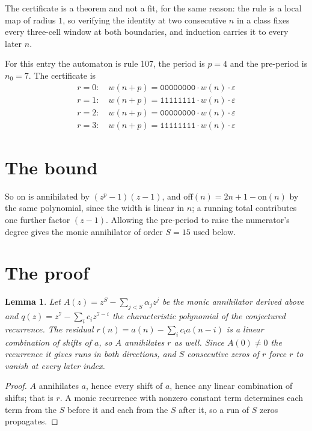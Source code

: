 \documentclass[11pt,a4paper]{article}
\theoremstyle{plain}
\newtheorem{lemma}[theorem]{Lemma}
\theoremstyle{definition}
\begin{document}
The certificate is a theorem and not a fit, for the same reason: the rule is a local map of
radius $1$, so verifying the identity at two consecutive $n$ in a class fixes every three-cell
window at both boundaries, and induction carries it to every later $n$.

For this entry the automaton is rule 107, the period is $p=4$ and the pre-period is $n_0=7$.
The certificate is
\begin{gather*}
r=0:\quad w(n+p) = \texttt{00000000} \cdot w(n) \cdot \varepsilon \\
r=1:\quad w(n+p) = \texttt{11111111} \cdot w(n) \cdot \varepsilon \\
r=2:\quad w(n+p) = \texttt{00000000} \cdot w(n) \cdot \varepsilon \\
r=3:\quad w(n+p) = \texttt{11111111} \cdot w(n) \cdot \varepsilon
\end{gather*}

\section{The bound}

So
$\mathrm{on}$ is annihilated by $(z^p-1)(z-1)$, and $\mathrm{off}(n)=2n+1-\mathrm{on}(n)$ by
the same polynomial, since the width is linear in $n$; a running total contributes one further
factor $(z-1)$. Allowing the pre-period to raise the numerator's degree gives the monic
annihilator of order $S=15$ used below.

\section{The proof}

\begin{lemma}\label{lem:crit}
Let $A(z)=z^S-\sum_{j<S}\alpha_jz^{j}$ be the monic annihilator derived above and
$q(z)=z^{7}-\sum_ic_iz^{7-i}$ the characteristic polynomial of the conjectured
recurrence. The residual $r(n)=a(n)-\sum_ic_ia(n-i)$ is a linear combination of shifts of $a$,
so $A$ annihilates $r$ as well. Since $A(0)\ne0$ the recurrence it gives runs in both
directions, and $S$ consecutive zeros of $r$ force $r$ to vanish at every later index.
\end{lemma}

\begin{proof}
$A$ annihilates $a$, hence every shift of $a$, hence any linear combination of shifts; that is
$r$. A monic recurrence with nonzero constant term determines each term from the $S$ before it
and each from the $S$ after it, so a run of $S$ zeros propagates.
\end{proof}
\end{document}
